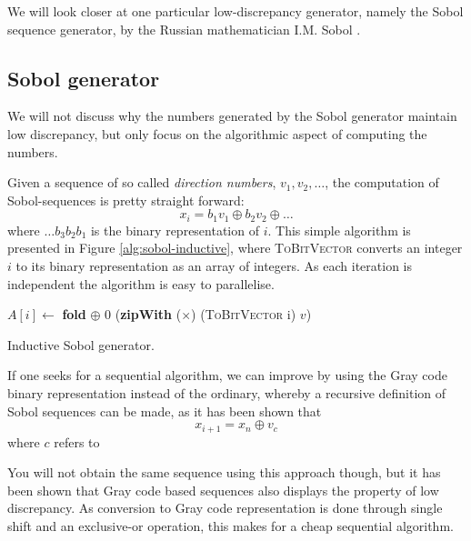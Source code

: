 
We will look closer at one particular low-discrepancy generator,
namely the Sobol sequence generator, by the Russian mathematician
I.M. Sobol \cite{sobol1967}. 


\subsection{Sobol generator}
We will not discuss why the numbers generated by the Sobol generator
maintain low discrepancy, but only focus on the algorithmic aspect of
computing the numbers.

Given a sequence of so called \emph{direction numbers}, $v_1, v_2,
\ldots$, the computation of Sobol-sequences is pretty straight forward:
$$x_i = b_1v_1 \oplus b_2v_2 \oplus \ldots$$
where $\ldots b_3b_2b_1$ is the binary representation of $i$. This
simple algorithm is presented in Figure \ref{alg:sobol-inductive},
where \textsc{ToBitVector} converts an integer $i$ to its binary
representation as an array of integers. As each iteration is
independent the algorithm is easy to parallelise.

\begin{algorithm}
  \begin{algorithmic}
    \State $A[i] \gets$ \textbf{fold} $\oplus$ 0 (\textbf{zipWith} ($\times$) (\textsc{ToBitVector} i) $v$)
    \EndFor
    \EndFunction
  \end{algorithmic}
  \caption{Inductive Sobol generator.}
  \label{alg:sobol-inductive}
\end{algorithm}

If one seeks for a sequential algorithm, we can improve by 
using the Gray code binary representation instead of the ordinary,
whereby a recursive definition of Sobol sequences can be made, as it
has been shown that
$$x_{i+1} = x_n \oplus v_c$$
where $c$ refers to 

You will not obtain the same sequence using this approach though, but
it has been shown  that Gray code based sequences also
displays the property of low discrepancy. As conversion to Gray code
representation is done through single shift and an exclusive-or
operation, this makes for a cheap sequential algorithm.

